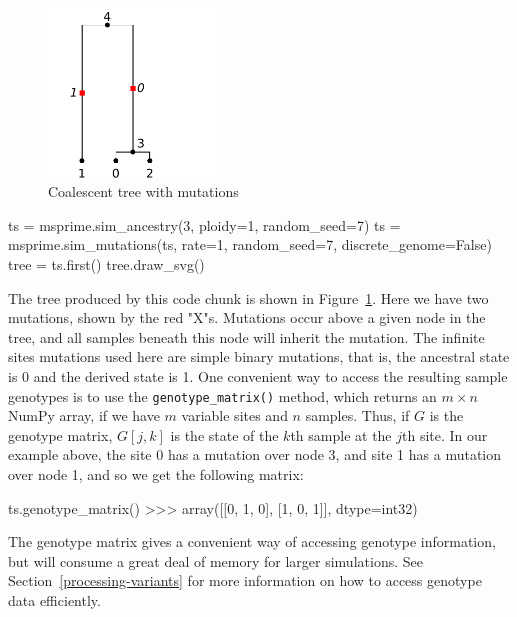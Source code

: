 \documentclass[graybox]{svmult}
\begin{document}
\begin{figure}[t]
\begin{center}
\includegraphics[width=0.4\textwidth]{images/plot_2.pdf}
\end{center}
\caption{\label{fig-tree-mutations} Coalescent tree with mutations}
\end{figure}

\begin{pythoncode}
ts = msprime.sim_ancestry(3, ploidy=1, random_seed=7)
ts = msprime.sim_mutations(ts, rate=1, random_seed=7,
                           discrete_genome=False)
tree = ts.first()
tree.draw_svg()
\end{pythoncode}

The tree produced by this code chunk is shown in
Figure~\ref{fig-tree-mutations}. Here we have two mutations, shown by the red "X"s.
Mutations occur above a given node in the tree, and all samples beneath
this node will inherit the mutation. The infinite sites mutations used
here are simple binary mutations, that is, the ancestral state is 0 and
the derived state is 1. One convenient way to access the resulting
sample genotypes is to use the \texttt{genotype\_matrix()} method, which
returns an \(m \times n\) NumPy array, if we have \(m\) variable sites
and \(n\) samples. Thus, if \(G\) is the genotype matrix, \(G[j, k]\) is
the state of the \(k\)th sample at the \(j\)th site. In our example
above, the site 0 has a mutation over node 3, and site 1 has a mutation
over node 1, and so we get the following matrix:

\begin{pythoncode}
ts.genotype_matrix()
>>> array([[0, 1, 0],
           [1, 0, 1]], dtype=int32)
\end{pythoncode}

    The genotype matrix gives a convenient way of accessing genotype
information, but will consume a great deal of memory for larger
simulations. See Section~\ref{processing-variants} for more information
on how to access genotype data efficiently.
\end{document}
